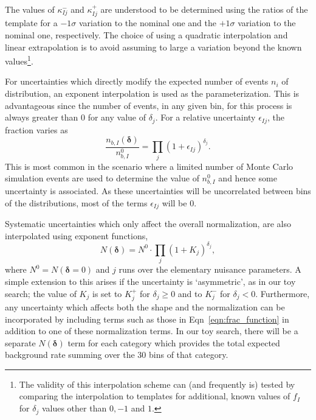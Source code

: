 \documentclass[11pt]{article}
\begin{document}
The values of $\kappa_{Ij}^{-}$ and $\kappa_{Ij}^{+}$ are understood to be determined using the ratios of the template for a $-1\sigma$ variation to the nominal one and the $+1\sigma$
variation to the nominal one, respectively. The choice of using a quadratic interpolation and linear extrapolation is to avoid assuming to large a variation beyond the known
values\footnote{The validity of this interpolation scheme can (and frequently is) tested by comparing the interpolation to templates for additional, known values of $f_{I}$ for $\delta_{j}$ values other than $0,-1$ and $1$.}.

For uncertainties which directly modify the expected number of events $n_{i}$ of distribution, an exponent interpolation is used as the parameterization.
This is advantageous since the number of events, in any given bin, for this process is always greater than 0 for any value of $\delta_{j}$. For a relative uncertainty $\epsilon_{Ij}$, the fraction varies as
%
\begin{equation}
 \frac{n_{b,I}(\bm{\delta})}{n_{b,I}^{0}}  =  \prod_{j} (1+\epsilon_{Ij})^{\delta_{j}}.
  \label{eqn:bin_function}
\end{equation}
%
This is most common in the scenario where a limited number of Monte Carlo simulation events are used to determine the value of $n_{b,I}^{0}$
and hence some uncertainty is associated. As these uncertainties will be uncorrelated between bins of the distributions, most of the terms $\epsilon_{Ij}$ will be 0.

Systematic uncertainties which only affect the overall normalization, are also interpolated using exponent functions,
%
\begin{equation}
 N(\bm{\delta})  =   N^{0} \cdot \prod_{j} (1+K_{j})^{\delta_{j}},
 \label{eqn:norm_function}
\end{equation}
%
where $N^{0} = N(\bm{\delta}=0)$ and $j$ runs over the elementary nuisance parameters.  A simple extension to this arises if the uncertainty is `asymmetric', as in our toy search;
the value of $K_{j}$ is set to $K^{+}_{j}$ for $\delta_{j}\geq0$ and to $K^{-}_{j}$ for $\delta_{j} < 0$. Furthermore, any uncertainty which affects both the
shape and the normalization can be incorporated by including terms such as those in Eqn~\ref{eqn:frac_function} in addition to one of these normalization terms.
In our toy search, there will be a separate $N(\bm{\delta})$ term for each category which provides the total expected background rate summing over the 30 bins of that category.
\end{document}
